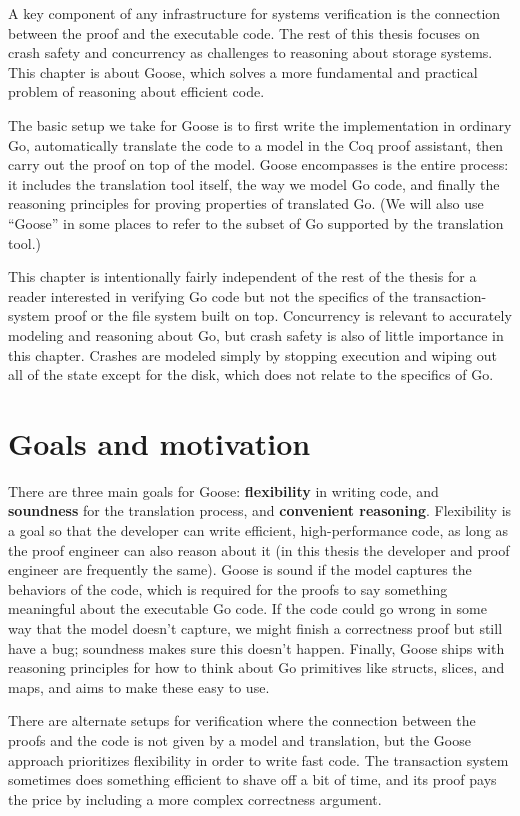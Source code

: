 A key component of any infrastructure for systems verification is the connection
between the proof and the executable code. The rest of this thesis focuses on
crash safety and concurrency as challenges to reasoning about storage systems.
This chapter is about Goose, which solves a more fundamental and practical
problem of reasoning about efficient code.

The basic setup we take for Goose is to first write the implementation in
ordinary Go, automatically translate the code to a model in the Coq proof
assistant, then carry out the proof on top of the model. Goose encompasses is
the entire process: it includes the translation tool itself, the way we model Go
code, and finally the reasoning principles for proving properties of translated
Go. (We will also use ``Goose'' in some places to refer to the subset of Go
supported by the translation tool.)

This chapter is intentionally fairly independent of the rest of the thesis for a
reader interested in verifying Go code but not the specifics of the
transaction-system proof or the file system built on top. Concurrency is
relevant to accurately modeling and reasoning about Go, but crash safety is also
of little importance in this chapter. Crashes are modeled simply by stopping
execution and wiping out all of the state except for the disk, which does not
relate to the specifics of Go.

\section{Goals and motivation}

There are three main goals for Goose: \textbf{flexibility} in writing code, and
\textbf{soundness} for the translation process, and \textbf{convenient
reasoning}. Flexibility is a goal so that the developer can write efficient,
high-performance code, as long as the proof engineer can also reason about it
(in this thesis the developer and proof engineer are frequently the same). Goose
is sound if the model captures the behaviors of the code, which is required for
the proofs to say something meaningful about the executable Go code. If the code
could go wrong in some way that the model doesn't capture, we might finish a
correctness proof but still have a bug; soundness makes sure this doesn't
happen. Finally, Goose ships with reasoning principles for how to think about Go
primitives like structs, slices, and maps, and aims to make these easy to use.

There are alternate setups for verification where the connection between the
proofs and the code is not given by a model and translation, but the Goose
approach prioritizes flexibility in order to write fast code. The transaction
system sometimes does something efficient to shave off a bit of time, and its
proof pays the price by including a more complex correctness argument.

